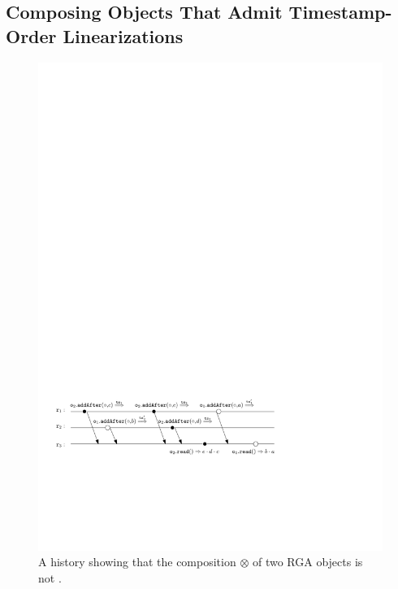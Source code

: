 \subsection{Composing Objects That Admit Timestamp-Order Linearizations}

%

\begin{figure}[t]
  \centering
  \includegraphics[width=0.7 \textwidth]{figures/LWWReg-LWWReg-NoSTS.pdf}
\vspace{-1mm}
  \caption{A history showing that the composition $\otimes$ of two RGA objects is not \crdtlinearizable{}.}
  \label{fig:negative_ts_composition}
  \vspace{-3mm}
\end{figure}


